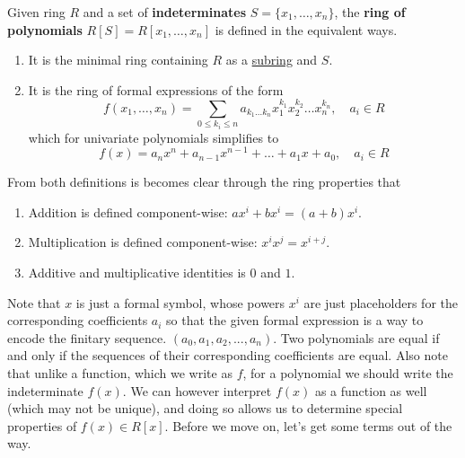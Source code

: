   \begin{definition}
    \label{def:polynomial-ring}
    Given ring $R$ and a set of \textbf{indeterminates} $S = \{x_1, \ldots, x_n\}$, the \textbf{ring of polynomials} $R[S] = R[x_1, \ldots, x_n]$ is defined in the equivalent ways. 
    \begin{enumerate}
      \item It is the minimal ring containing $R$ as a \hyperref[def:subring]{subring} and $S$. 
      \item It is the ring of formal expressions of the form 
      \begin{equation}
        f(x_1, \ldots, x_n) = \sum_{0 \leq k_i \leq n} a_{k_1 \ldots k_n} x_1^{k_1} x_2^{k_2} \ldots x_n^{k_n}, \quad a_i \in R
      \end{equation}
      which for univariate polynomials simplifies to 
      \begin{equation}
        f(x) = a_nx^n + a_{n-1}x^{n-1} + \dots + a_1 x + a_0, \quad a_i \in R
      \end{equation}
    \end{enumerate}
    From both definitions is becomes clear through the ring properties that 
    \begin{enumerate}
      \item Addition is defined component-wise: $a x^i + b x^i = (a + b) x^i$. 
      \item Multiplication is defined component-wise: $x^i x^j = x^{i + j}$. 
      \item Additive and multiplicative identities is $0$ and $1$. 
    \end{enumerate}
  \end{definition}

  Note that $x$ is just a formal symbol, whose powers $x^i$ are just placeholders for the corresponding coefficients $a_i$ so that the given formal expression is a way to encode the finitary sequence. $(a_0, a_1, a_2, ..., a_n)$. Two polynomials are equal if and only if the sequences of their corresponding coefficients are equal. Also note that unlike a function, which we write as $f$, for a polynomial we should write the indeterminate $f(x)$. We can however interpret $f(x)$ as a function as well (which may not be unique), and doing so allows us to determine special properties of $f(x) \in R[x]$. Before we move on, let's get some terms out of the way. 

